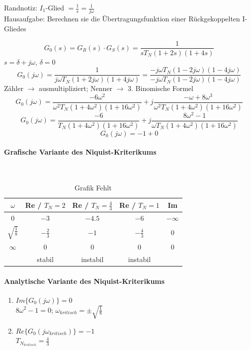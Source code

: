 \documentclass[a4paper, twoside, 11pt]{article}
\begin{document}
Randnotiz: $I_1$-Glied $=\frac{1}{s} = \frac{1}{j\omega}$ \\
Hausaufgabe: Berechnen sie die Übertragungsfunktion einer Rückgekoppelten I-Gliedes

\vspace{1em}
\begin{center}
	\[ G_0(s) = G_R(s) \cdot G_S(s) = \frac{1}{sT_N (1+2s) (1+4s)} \]
	$ s = \delta + j\omega$, $ \delta = 0 $
	\[ G_0(j\omega) = \frac{1}{j\omega T_N (1+2j\omega)(1+4j\omega)} = \frac{-j\omega T_N (1-2j\omega)(1-4j\omega)}{-j\omega T_N (1-2j\omega)(1-4j\omega)} \]
	Zähler $\to$ ausmultipliziert; Nenner $\to$ 3. Binomische Formel
	\[ G_0(j\omega) = \frac{-6\omega^2}{\omega^2 T_N (1+4\omega^2)(1+16\omega^2)} + j \frac{-\omega + 8\omega^3}{\omega^2 T_N (1+4\omega^2)(1+16\omega^2)} \]
	\[ G_0(j\omega) = \frac{-6}{T_N (1+4\omega^2)(1+16\omega^2)} + j \frac{8\omega^2 -1}{\omega T_N (1+4\omega^2)(1+16\omega^2)} \]
	\[ G_0(j\omega) = -1 + 0\]
\end{center}

\paragraph{Grafische Variante des Niquist-Kriterikums} \mbox{} \\
\begin{table}[h]
	\centering
	\begin{tabular}{|c||c|c|c|c|}
	\hline
	$\omega$ 				& Re / $T_N=2$		& Re / $T_N = \frac{4}{3}$ 	& Re / $T_N = 1$	& Im 		\\ \hline\hline
	0						& $-3$ 				& $-4.5$					& $-6$				& $-\infty$ \\ \hline
	$\sqrt{\frac{1}{8}}$ 	& $-\frac{2}{3}$ 	& $-1$ 						& $-\frac{4}{3}$	& 0			\\ \hline
	$\infty$ 				& 0					& 0							& 0					& 0			\\ \hline
							& stabil			& instabil					& instabil			&			\\ \hline
	\end{tabular}
	\caption{Grafik Fehlt}
\end{table}

\paragraph{Analytische Variante des Niquist-Kriterikums}
\begin{enumerate}
	\item $Im\{ G_0(j\omega)\} = 0$ \\
	$8 \omega^2-1=0$; $\omega_{kritisch} = \pm \sqrt{\frac{1}{8}}$
	\item $Re \{ G_0(j\omega_{kritisch}) \} = -1$ \\
	$T_{N_{kritisch}} = \frac{4}{3}$
\end{enumerate}
\end{document}
